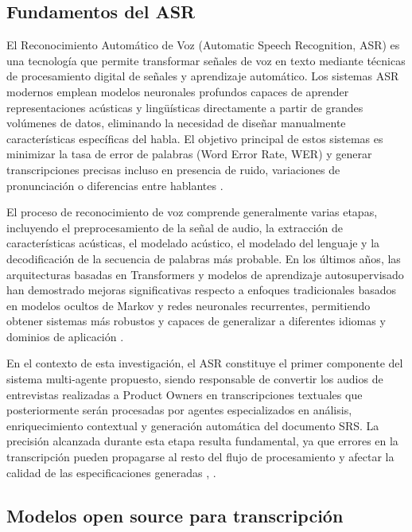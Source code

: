 \subsection{Fundamentos del ASR}

El Reconocimiento Automático de Voz (Automatic Speech Recognition, ASR) es una tecnología que permite transformar señales de voz en texto mediante 
técnicas de procesamiento digital de señales y aprendizaje automático. Los sistemas ASR modernos emplean modelos neuronales profundos capaces de 
aprender representaciones acústicas y lingüísticas directamente a partir de grandes volúmenes de datos, eliminando la necesidad de diseñar manualmente 
características específicas del habla. El objetivo principal de estos sistemas es minimizar la tasa de error de palabras (Word Error Rate, WER) y generar 
transcripciones precisas incluso en presencia de ruido, variaciones de pronunciación o diferencias entre hablantes \cite{Radford2022}.

El proceso de reconocimiento de voz comprende generalmente varias etapas, incluyendo el preprocesamiento de la señal de audio, la extracción de 
características acústicas, el modelado acústico, el modelado del lenguaje y la decodificación de la secuencia de palabras más probable. En los últimos 
años, las arquitecturas basadas en Transformers y modelos de aprendizaje autosupervisado han demostrado mejoras significativas respecto a enfoques 
tradicionales basados en modelos ocultos de Markov y redes neuronales recurrentes, permitiendo obtener sistemas más robustos y capaces de generalizar a 
diferentes idiomas y dominios de aplicación \cite{baevski2020wav2vec}.

En el contexto de esta investigación, el ASR constituye el primer componente del sistema multi-agente propuesto, siendo responsable de convertir los 
audios de entrevistas realizadas a Product Owners en transcripciones textuales que posteriormente serán procesadas por agentes especializados en análisis, 
enriquecimiento contextual y generación automática del documento SRS. La precisión alcanzada durante esta etapa resulta fundamental, ya que errores en la 
transcripción pueden propagarse al resto del flujo de procesamiento y afectar la calidad de las especificaciones generadas \cite{Radford2022}, \cite{Umar2024}.



\subsection{Modelos open source para transcripción}

